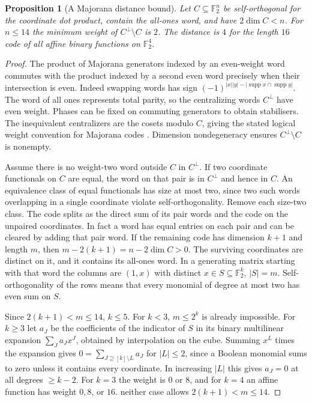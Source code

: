\documentclass[aps,pra,onecolumn,superscriptaddress,nofootinbib,10pt]{revtex4-2}
\newtheorem{proposition}[theorem]{Proposition}
\theoremstyle{definition}
\theoremstyle{remark}
\begin{document}
\begin{proposition}[A Majorana distance bound]\label{ob:majorana}
Let \(C\subseteq\mathbb F_2^n\) be self-orthogonal for the coordinate
dot product, contain the all-ones word, and have \(2\dim C<n\).
For \(n\le14\) the minimum weight of \(C^\perp\setminus C\) is \(2\).
The distance is \(4\) for the length \(16\) code of all affine
binary functions on \(\mathbb F_2^4\).
\end{proposition}
\begin{proof}
The product of Majorana generators indexed by an even-weight word
commutes with the product indexed by a second even word precisely
when their intersection is even. Indeed swapping words has sign
\((-1)^{|x||y|-|\operatorname{supp}x\cap\operatorname{supp}y|}\).
The word of all ones represents total parity, so the centralizing
words \(C^\perp\) have even weight. Phases can be fixed on commuting
generators to obtain stabilisers. The inequivalent centralizers
are the cosets modulo \(C\), giving the stated logical weight
convention for Majorana codes \cite{obr:hastings}. Dimension
nondegeneracy ensures \(C^\perp\setminus C\) is nonempty.

Assume there is no weight-two word outside \(C\) in \(C^\perp\).
If two coordinate functionals on \(C\) are equal, the word on that
pair is in \(C^\perp\) and hence in \(C\). An equivalence class of
equal functionals has size at most two, since two such words
overlapping in a single coordinate violate self-orthogonality.
Remove each size-two class. The code splits as the direct sum of
its pair words and the code on the unpaired coordinates. In fact a
word has equal entries on each pair and can be cleared by adding that
pair word. If the remaining code has dimension \(k+1\) and length
\(m\), then \(m-2(k+1)=n-2\dim C>0\). The surviving coordinates are
distinct on it, and it contains its all-ones word. In a generating
matrix starting with that word the columns are \((1,x)\) with
distinct \(x\in S\subseteq\mathbb F_2^k\), \(|S|=m\).
Self-orthogonality of the rows means that every monomial of degree
at most two has even sum on \(S\).

Since \(2(k+1)<m\le14\), \(k\le5\). For \(k<3\), \(m\le2^k\)
is already impossible. For \(k\ge3\) let \(a_J\) be the coefficients
of the indicator of \(S\) in its binary multilinear expansion
\(\sum_J a_J x^J\), obtained by interpolation on the cube.
Summing \(x^L\) times the expansion gives
\(0=\sum_{J\supseteq[k]\setminus L} a_J\) for \(|L|\le2\),
since a Boolean monomial sums to zero unless it contains every
coordinate. In increasing \(|L|\) this gives \(a_J=0\) at
all degrees \(\ge k-2\). For \(k=3\) the weight is \(0\) or \(8\),
and for \(k=4\) an affine function has weight \(0,8\), or \(16\).
neither case allows \(2(k+1)<m\le14\).


\end{proof}
\end{document}
